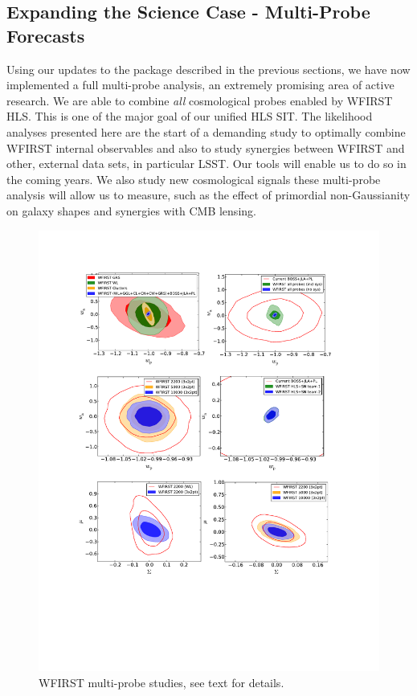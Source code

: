 \subsection{Expanding the Science Case - Multi-Probe Forecasts}

\begin{summaryii}
Using our updates to the \CoLi package described in the previous sections, we have now implemented a full multi-probe analysis, an extremely promising area of active research. We are able to combine \emph{all} cosmological probes enabled by WFIRST HLS. This is one of the major goal of our unified HLS SIT. The likelihood analyses presented here are the start of a demanding study to optimally combine WFIRST internal observables and also to study synergies between WFIRST and other, external data sets, in particular LSST\@. Our tools will enable us to do so in the coming years. We also study new cosmological signals these multi-probe analysis will allow us to measure, such as the effect of primordial non-Gaussianity on galaxy shapes and synergies with CMB lensing.
\end{summaryii}


\label{sec:multi-probe}
\begin{figure}
\includegraphics[width=15cm]{Plots/forecasts/multi}
\caption{WFIRST multi-probe studies, see text for details.}
\label{fi:multi}
\end{figure}

